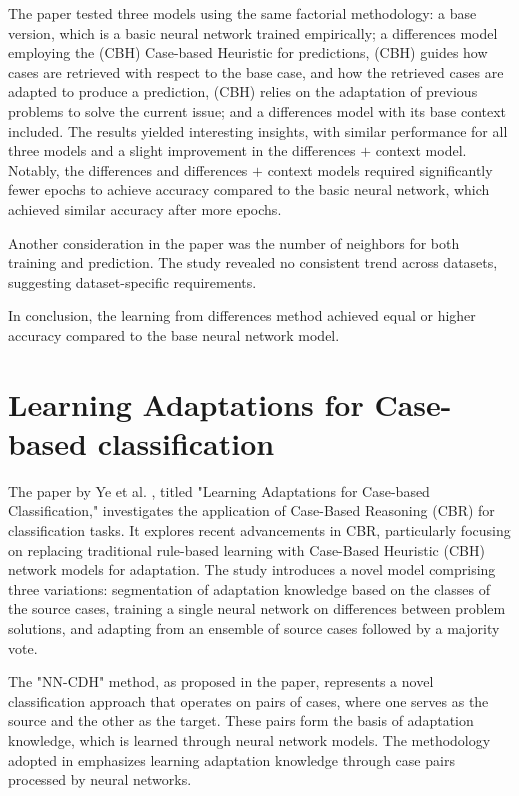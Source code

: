 \documentclass[a4paper, 12pt]{report}
\begin{document}
The paper tested three models using the same factorial methodology: a base version, which is a basic neural network trained
empirically; a differences model employing the (CBH) Case-based Heuristic for predictions, (CBH) guides how cases are retrieved with respect to the base case, 
and how the retrieved cases are adapted to produce a prediction, (CBH) relies on the adaptation of previous problems to solve the current issue; 
and a differences model with its base context included.
The results yielded interesting insights, with similar performance for all three models and a slight improvement in the differences $+$ context model.
Notably, the differences and differences $+$ context models required significantly fewer epochs to achieve accuracy compared to the basic neural network, which achieved similar accuracy after more epochs.

Another consideration in the paper \cite{learningFromDifferences2022} was the number of neighbors for both training and prediction.
The study revealed no consistent trend across datasets, suggesting dataset-specific requirements.

In conclusion, the learning from differences method achieved equal or higher accuracy compared to the base neural network model.

\section{Learning Adaptations for Case-based classification}

The paper by Ye et al. \cite{ye2021learning}, titled "Learning Adaptations for Case-based Classification," investigates the application of Case-Based Reasoning (CBR) for classification tasks. 
It explores recent advancements in CBR, particularly focusing on replacing traditional rule-based learning with Case-Based Heuristic (CBH) network models for adaptation. 
The study introduces a novel model comprising three variations: segmentation of adaptation knowledge based on the classes of the source cases, training a single neural network on differences between problem solutions,
and adapting from an ensemble of source cases followed by a majority vote.

The "NN-CDH" method, as proposed in the paper, represents a novel classification approach that operates on pairs of cases, where one serves as the source and the other as the target. 
These pairs form the basis of adaptation knowledge, which is learned through neural network models. 
The methodology adopted in \cite{ye2021learning} emphasizes learning adaptation knowledge through case pairs processed by neural networks.
\end{document}
